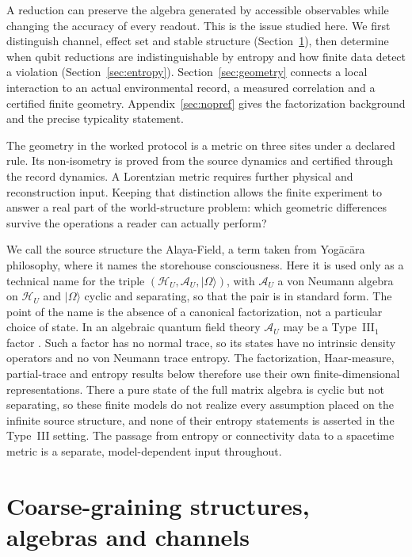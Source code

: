 \documentclass[12pt,a4paper]{article}
\begin{document}
A reduction can preserve the algebra generated by accessible observables while changing the accuracy of every readout. This is the issue studied here. We first distinguish channel, effect set and stable structure (Section~\ref{sec:coarse}), then determine when qubit reductions are indistinguishable by entropy and how finite data detect a violation (Section~\ref{sec:entropy}). Section~\ref{sec:geometry} connects a local interaction to an actual environmental record, a measured correlation and a certified finite geometry. Appendix~\ref{sec:nopref} gives the factorization background and the precise typicality statement.

The geometry in the worked protocol is a metric on three sites under a declared rule. Its non-isometry is proved from the source dynamics and certified through the record dynamics. A Lorentzian metric requires further physical and reconstruction input. Keeping that distinction allows the finite experiment to answer a real part of the world-structure problem: which geometric differences survive the operations a reader can actually perform?

We call the source structure the Alaya-Field, a term taken from Yog\=ac\=ara philosophy, where it names the storehouse consciousness. Here it is used only as a technical name for the triple $(\mathcal H_U,\mathcal A_U,|\Omega\rangle)$, with $\mathcal A_U$ a von Neumann algebra on $\mathcal H_U$ and $|\Omega\rangle$ cyclic and separating, so that the pair is in standard form. The point of the name is the absence of a canonical factorization, not a particular choice of state. In an algebraic quantum field theory $\mathcal A_U$ may be a Type~III$_1$ factor \cite{Haag1996}. Such a factor has no normal trace, so its states have no intrinsic density operators and no von Neumann trace entropy. The factorization, Haar-measure, partial-trace and entropy results below therefore use their own finite-dimensional representations. There a pure state of the full matrix algebra is cyclic but not separating, so these finite models do not realize every assumption placed on the infinite source structure, and none of their entropy statements is asserted in the Type~III setting. The passage from entropy or connectivity data to a spacetime metric is a separate, model-dependent input throughout.

\section{Coarse-graining structures, algebras and channels}
\label{sec:coarse}
\end{document}
